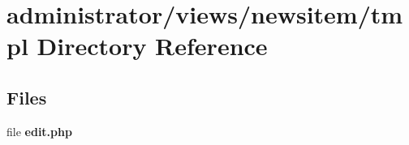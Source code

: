 \section{administrator/views/newsitem/tmpl Directory Reference}
\label{dir_339980009d206468fc8dac3e068646e0}
\subsection*{Files}
\begin{DoxyCompactItemize}
\item 
file \textbf{ edit.\+php}
\end{DoxyCompactItemize}

